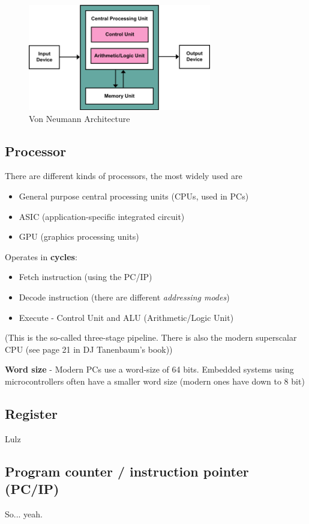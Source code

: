 \documentclass{article}
\begin{document}
\begin{figure}[H]
  \centering
  \includegraphics[width=8.0cm]{images/330px-Von_Neumann_Architecture.png}
  \caption{Von Neumann Architecture}
\end{figure}


\subsection{Processor}
There are different kinds of processors, the most widely used are
\begin{itemize}
	\item General purpose central processing units (CPUs, used in PCs)
	\item ASIC (application-specific integrated circuit)
	\item GPU (graphics processing units)
\end{itemize}

Operates in \textbf{cycles}:
\begin{itemize}
	\item Fetch instruction (using the PC/IP)
	\item Decode instruction (there are different \emph{addressing modes})
	\item Execute - Control Unit and ALU (Arithmetic/Logic Unit)
\end{itemize}
(This is the so-called three-stage pipeline. There is also the modern superscalar CPU (see page 21 in DJ Tanenbaum's book))

\textbf{Word size} - Modern PCs use a word-size of 64 bits. Embedded systems using microcontrollers often have a smaller word size (modern ones have down to 8 bit)

\subsection{Register}
Lulz

\subsection{Program counter / instruction pointer (PC/IP)}
So... yeah.
\end{document}

